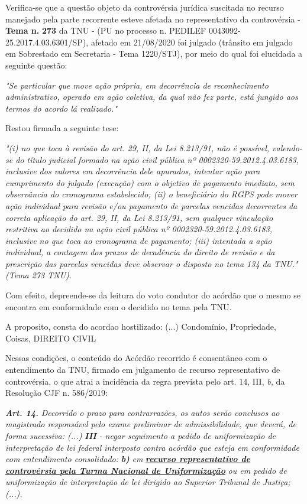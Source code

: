 \documentclass[12pt]{article}
\begin{document}
\justifying
\noindent Verifica-se que a questão objeto da controvérsia jurídica suscitada no recurso manejado pela parte recorrente esteve afetada no representativo da controvérsia - \textbf{Tema n. }\textbf{273} da TNU - (PU no processo n. PEDILEF 0043092-25.2017.4.03.6301/SP),  afetado em 21/08/2020 foi julgado (trânsito em julgado em Sobrestado em Secretaria - Tema 1220/STJ), por meio do qual foi elucidada a seguinte questão:

\noindent \textit{"Se particular que move ação própria, em decorrência de reconhecimento administrativo, operado em ação coletiva, da qual não fez parte, está jungido aos termos do acordo lá realizado."}

\noindent Restou firmada a seguinte tese:

\noindent \textit{"(i) no que toca à revisão do art. 29, II, da Lei 8.213/91, não é possível, valendo-se do título judicial formado na ação civil pública nº 0002320-59.2012.4.03.6183, inclusive dos valores em decorrência dele apurados, intentar ação para cumprimento do julgado (execução) com o objetivo de pagamento imediato, sem observância do cronograma estabelecido; (ii) o beneficiário do RGPS pode mover ação individual para revisão e/ou pagamento de parcelas vencidas decorrentes da correta aplicação do art. 29, II, da Lei 8.213/91, sem qualquer vinculação restritiva ao decidido na ação civil pública nº 0002320-59.2012.4.03.6183, inclusive no que toca ao cronograma de pagamento; (iii) intentada a ação individual, a contagem dos prazos de decadência do direito de revisão e da prescrição das parcelas vencidas deve observar o disposto no tema 134 da TNU." (Tema 273 TNU).}

\noindent Com efeito, depreende-se da leitura do voto condutor do acórdão que o mesmo se encontra em conformidade com o decidido no  tema pela TNU.

\noindent A proposito, consta do acordao hostilizado: (...) Condomínio, Propriedade, Coisas, DIREITO CIVIL

\noindent Nessas condições, o conteúdo do Acórdão recorrido é consentâneo com o entendimento da TNU, firmado em julgamento de recurso representativo de controvérsia, o que atrai a incidência da regra prevista pelo art. 14, III, \textit{b,} da Resolução CJF n. 586/2019:

\noindent \textit{\textbf{Art. 14.}}\textit{ Decorrido o prazo para contrarrazões, os autos serão conclusos ao magistrado responsável pelo exame preliminar de admissibilidade, que deverá, de forma sucessiva: (...) }\textit{\textbf{III }}\textit{- negar seguimento a pedido de uniformização de interpretação de lei federal interposto contra acórdão que esteja em conformidade com entendimento consolidado: }\textit{\textbf{b)}}\textit{ em }\uline{\textit{\textbf{recurso representativo de controvérsia pela Turma Nacional de Uniformização}}}\textit{ ou em pedido de uniformização de interpretação de lei dirigido ao Superior Tribunal de Justiça;(...).}
\end{document}
